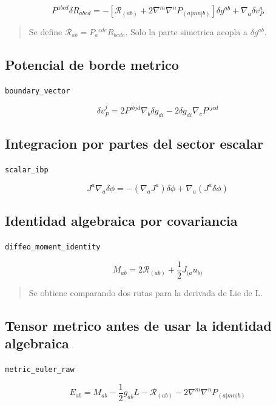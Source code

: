 \documentclass[11pt,a4paper]{article}
\begin{document}
\[
P^{abcd}\delta R_{abcd} = -[\mathcal R_{(ab)}+2\nabla^m\nabla^nP_{(a|mn|b)}]\delta g^{ab}+\nabla_a\delta v_P^a
\]

\begin{quote}\small Se define \(\mathcal R_{ab}=P_a{}^{cde}R_{bcde}\). Solo la parte simetrica acopla a \(\delta g^{ab}\).\end{quote}

\subsection{Potencial de borde metrico}

\noindent\texttt{boundary\_vector}\par\nopagebreak[4]

\[
\delta v_P^j = 2P^{ibjd}\nabla_b\delta g_{di}-2\delta g_{di}\nabla_cP^{ijcd}
\]

\subsection{Integracion por partes del sector escalar}

\noindent\texttt{scalar\_ibp}\par\nopagebreak[4]

\[
J^a\nabla_a\delta\phi = -(\nabla_aJ^a)\delta\phi+\nabla_a(J^a\delta\phi)
\]

\subsection{Identidad algebraica por covariancia}

\noindent\texttt{diffeo\_moment\_identity}\par\nopagebreak[4]

\[
M_{ab} = 2\mathcal R_{(ab)}+\frac12J_{(a}u_{b)}
\]

\begin{quote}\small Se obtiene comparando dos rutas para la derivada de Lie de L.\end{quote}

\subsection{Tensor metrico antes de usar la identidad algebraica}

\noindent\texttt{metric\_euler\_raw}\par\nopagebreak[4]

\[
E_{ab} = M_{ab}-\frac12g_{ab}L-\mathcal R_{(ab)}-2\nabla^m\nabla^nP_{(a|mn|b)}
\]
\end{document}
